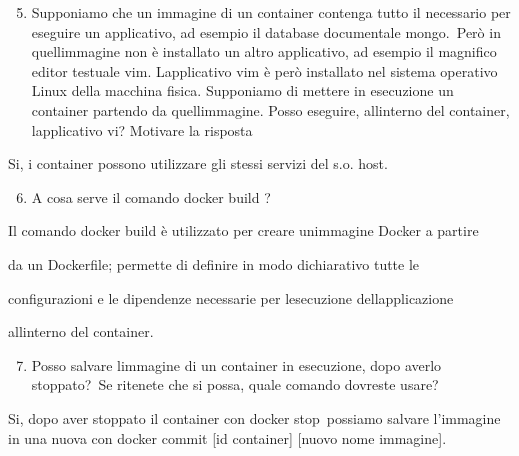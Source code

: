 \documentclass[
]{article}
\providecommand{\tightlist}{%
  \setlength{\itemsep}{0pt}\setlength{\parskip}{0pt}}
\begin{document}
\begin{enumerate}
\setcounter{enumi}{4}
\tightlist
\item
  {Supponiamo che un immagine di un container contenga tutto il
  necessario per eseguire un applicativo, ad esempio il database
  documentale }{mongo.}{~Però in quell\textquotesingle immagine non è
  installato un altro applicativo, ad esempio il magnifico editor
  testuale vim. L\textquotesingle applicativo vim è però installato nel
  sistema operativo Linux della macchina fisica. Supponiamo di mettere
  in esecuzione un container partendo da quell\textquotesingle immagine.
  Posso eseguire, all\textquotesingle interno del container,
  l\textquotesingle applicativo vi? Motivare la risposta}
\end{enumerate}

{}

{Si, i container possono utilizzare gli stessi servizi del s.o. host.}

{}

{}

\begin{enumerate}
\setcounter{enumi}{5}
\tightlist
\item
  {A cosa serve il comando docker build ? }
\end{enumerate}

{}

{Il comando docker build è utilizzato per creare
un\textquotesingle immagine Docker a partire}

{da un Dockerfile; permette di definire in modo dichiarativo tutte le ~
}

{configurazioni e le dipendenze necessarie per
l\textquotesingle esecuzione dell\textquotesingle applicazione ~}

{all\textquotesingle interno del container.}

{}

\begin{enumerate}
\setcounter{enumi}{6}
\tightlist
\item
  {Posso salvare l\textquotesingle immagine di un container in
  esecuzione, dopo averlo }{stoppato?}{~Se ritenete che si possa, quale
  comando dovreste usare?}
\end{enumerate}

{}

{Si, dopo aver stoppato il container con }{docker stop}{~possiamo
salvare l'immagine in una nuova con }{docker commit {[}id container{]}
{[}nuovo nome immagine{]}}{.}

{}
\end{document}
